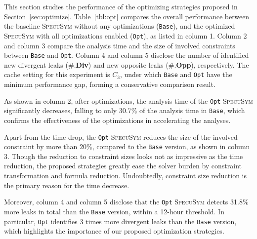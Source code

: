 \documentclass[sigconf,screen]{acmart}
\newcommand{\SpecuSym}{\textsc{SpecuSym} }
\begin{document}
This section studies the performance of the optimizing strategies proposed in 
Section~\ref{sec:optimize}. Table~\ref{tbl:opt} compares the overall performance 
between the baseline \SpecuSym without any optimizations (\texttt{Base}), and the
optimized \SpecuSym with all optimizations enabled (\texttt{Opt}), as listed in 
column 1. Column 2 and column 3 compare the analysis time and the size of involved 
constraints between \texttt{Base} and \texttt{Opt}. Column 4 and column 5 disclose 
the number of identified new divergent leaks (\#.\textbf{Div}) and new opposite 
leaks (\#.\textbf{Opp}), respectively. The cache setting for this experiment is
$C_3$, under which \texttt{Base} and \texttt{Opt} have the minimum performance 
gap, forming a conservative comparison result. 


As shown in column 2, after optimizations, the analysis time of the \texttt{Opt} 
\SpecuSym significantly decreases, falling to only $30.7\%$ of the analysis time
in \texttt{Base}, which confirms the effectiveness of the optimizations in 
accelerating the analyses. 


Apart from the time drop, the \texttt{Opt} \SpecuSym reduces the size of the 
involved constraint by more than $20\%$, compared to the \texttt{Base} version, 
as shown in column 3. Though the reduction to constraint sizes looks not as 
impressive as the time reduction, the proposed strategies greatly ease the solver 
burden by constraint transformation and formula reduction. Undoubtedly, constraint 
size reduction is the primary reason for the time decrease.


Moreover, column 4 and column 5 disclose that the \texttt{Opt} \SpecuSym 
detects 31.8\% more leaks in total than the \texttt{Base} version, within 
a 12-hour threshold. In particular, \texttt{Opt} identifies 3 times more 
divergent leaks than the \texttt{Base} version, which highlights the importance
of our proposed optimization strategies. 
\end{document}
